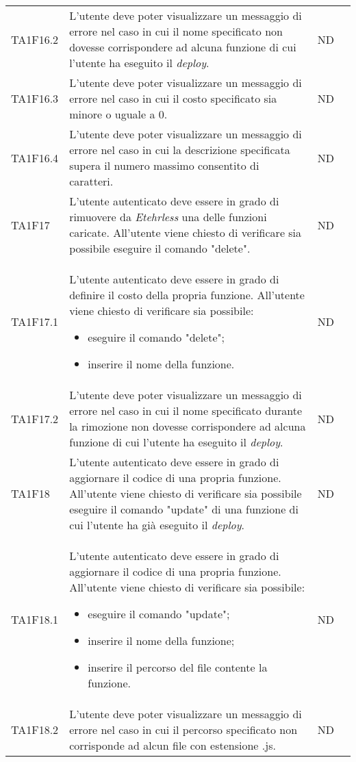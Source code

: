 \begin{longtable}{|C{1.5cm}|C{8cm}|C{3cm}|C{1cm}|}
	TA1F16.2  &
	L’utente deve poter visualizzare un messaggio di errore nel caso in cui il nome specificato non dovesse corrispondere ad alcuna funzione di cui l'utente ha eseguito il \textit{deploy\glos}. &
	ND \\

	TA1F16.3  &
	L’utente deve poter visualizzare un messaggio di errore nel caso in cui il costo specificato sia minore o uguale a 0. &
	ND \\

	TA1F16.4  &
	L’utente deve poter visualizzare un messaggio di errore nel caso in cui la descrizione specificata supera il numero massimo consentito di caratteri. &
	ND \\

	TA1F17  &
	L'utente autenticato deve essere in grado di rimuovere da \textit{Etehrless} una delle funzioni caricate. All’utente viene chiesto di verificare sia possibile eseguire il comando "delete". &
	ND \\

	TA1F17.1  &
	L'utente autenticato deve essere in grado di definire il costo della propria funzione. All’utente viene chiesto di verificare sia possibile:
	\begin{itemize}
		\item eseguire il comando "delete";
		\item inserire il nome della funzione.
	\end{itemize} &
	ND \\[-5ex]

	TA1F17.2  &
	L’utente deve poter visualizzare un messaggio di errore nel caso in cui il nome specificato durante la rimozione non dovesse corrispondere ad alcuna funzione di cui l'utente ha eseguito il \textit{deploy\glos}. &
	ND \\

	TA1F18  &
	L'utente autenticato deve essere in grado di aggiornare il codice di una propria funzione. All’utente viene chiesto di verificare sia possibile eseguire il comando "update" di una funzione di cui l'utente ha già eseguito il \textit{deploy\glos}. &
	ND \\

	TA1F18.1  &
	L'utente autenticato deve essere in grado di aggiornare il codice di una propria funzione. All’utente viene chiesto di verificare sia possibile:
	\begin{itemize}
		\item eseguire il comando "update";
		\item inserire il nome della funzione;
		\item inserire il percorso del file contente la funzione.
	\end{itemize} &
	ND \\[-5ex]

	TA1F18.2  &
	L’utente deve poter visualizzare un messaggio di errore nel caso in cui il percorso specificato non corrisponde ad alcun file con estensione .js. &
	ND \\
\end{longtable}


